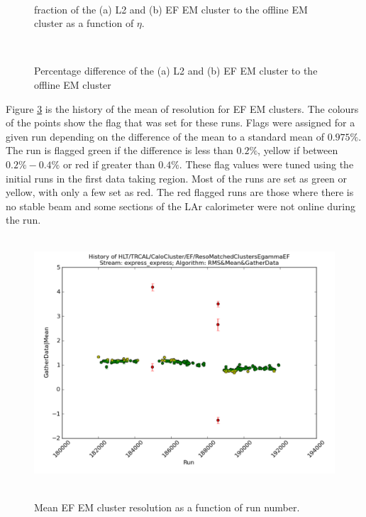 \begin{figure}
\centering
\mbox{
   \quad
      \quad
}
\caption[\et{} fraction of L2 and EF to offline EM objects]{\et{} fraction of the (a) L2 and (b) EF EM cluster to the offline EM cluster \et{} as a function of $\eta$. \label{SW_egamma_L2EF_EtFrac}}
\end{figure}

\begin{figure}
\centering
\mbox{
   \quad
      \quad
}
\caption[Offline EM \et{} versus L2/EF EM \et{}]{Percentage difference of the (a) L2 and (b) EF EM cluster \et{} to the offline EM cluster \et{}\label{SW_egamma_L2EF_Reso}}
\end{figure}


Figure \ref{SW_egamma_EF_Reso_Range} is the history of the mean of \et{} resolution for EF EM clusters.
The colours of the points show the flag that was set for these runs.
Flags were assigned for a given run depending on the difference of the mean to a standard mean of $0.975\%$. 
The run is flagged green if the difference is less than $0.2\%$, yellow if between $0.2\% - 0.4\%$ or red if greater than $0.4\%$.
These flag values were tuned using the initial runs in the first data taking region.
Most of the runs are set as green or yellow, with only a few set as red.
The red flagged runs are those where there is no stable beam and some sections of the LAr calorimeter were not online during the run.


\begin{figure}
\centering
\mbox{
   \includegraphics[width=1.0\textwidth]{figures/ServiceWork/EF_Reso_Range.pdf}
}
\caption[Offline EM \et{} versus L2/EF EM \et{}]{Mean EF EM cluster \et{} resolution as a function of run number. \label{SW_egamma_EF_Reso_Range}}
\end{figure}

